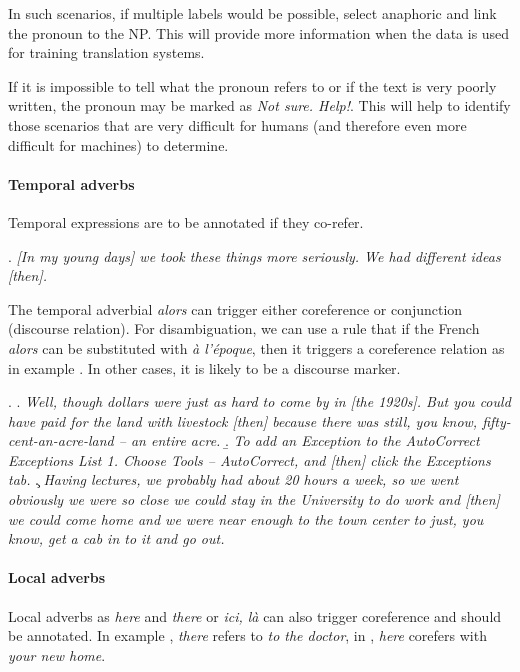 \documentclass[a4paper]{article}
\begin{document}
In such scenarios, if multiple labels would be possible, select anaphoric and link the pronoun to the NP. This will provide more information when the data is used for training translation systems.

If it is impossible to tell what the pronoun refers to or if the text is very poorly written, the pronoun may be marked as {\sl Not sure. Help!}. This will help to identify those scenarios that are very difficult for humans (and therefore even more difficult for machines) to determine.

\paragraph*{Temporal adverbs}

Temporal expressions are to be annotated if they co-refer.

\ex.
\textsl{[In my young days] we took these things more seriously. We had different ideas [then].}

The temporal adverbial \textsl{alors} can trigger either coreference or
conjunction (discourse relation). For disambiguation, we can use a rule that if
the French {\sl alors} can be substituted with {\sl à l'époque}, then it
triggers a coreference relation as in example \Next[a]. In  other cases, it is
likely to be a discourse marker. 

\ex.
\a. {\sl Well, though dollars were just as hard to come by in [the 1920s]. But you could have paid for the land with livestock [then] because there was still, you know, fifty-cent-an-acre-land -- an entire acre.}
\b. {\sl To add an Exception to the AutoCorrect Exceptions List 1. Choose Tools -- AutoCorrect, and [then] click the Exceptions tab.}
\c. {\sl 
Having lectures, we probably had about 20 hours a week, so we went obviously we were so close we could stay in the University to do work and [then] we could come home and we were near enough to the town center to just, you know, get a cab in to it and go out.}

\paragraph*{Local adverbs}
Local adverbs as {\sl here} and {\sl there} or {\sl ici, là} can also trigger
coreference and should be annotated. In example \Next[a], {\sl there} refers to
{\sl to the doctor}, in \Next[b], {\sl here} corefers with {\sl your new home}.
\end{document}
